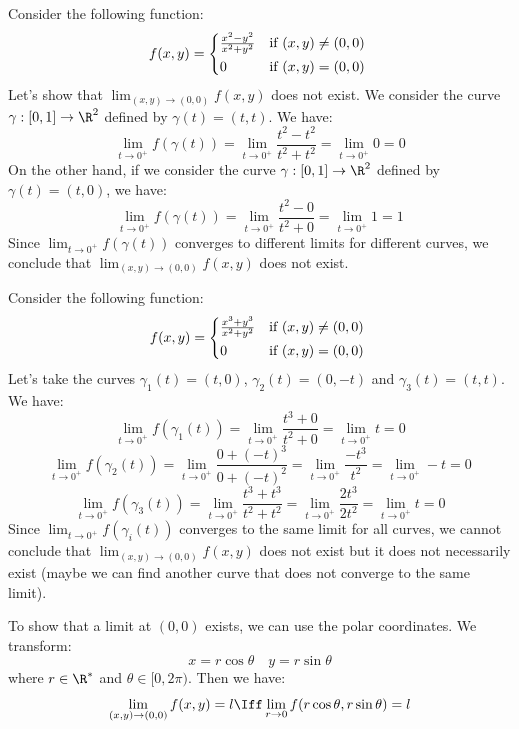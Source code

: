 \begin{eg}
    Consider the following function:
    \[
        f(x,y) = \begin{cases*}
            \frac{x^2 - y^2}{x^2 + y^2} & if $(x,y) \neq (0,0)$ \\
            0 & if $(x,y) = (0,0)$
        \end{cases*}
    \]
    Let's show that $\lim_{(x,y) \to (0,0)} f(x,y)$ does not exist. We consider the curve $\gamma: [0,1] \to \R^2$ defined by $\gamma(t) = (t,t)$. We have:
    \[
        \lim_{t \to 0^+} f(\gamma(t)) = \lim_{t \to 0^+} \frac{t^2 - t^2}{t^2 + t^2} = \lim_{t \to 0^+} 0 = 0
    \]
    On the other hand, if we consider the curve $\gamma: [0,1] \to \R^2$ defined by $\gamma(t) = (t,0)$, we have:
    \[
        \lim_{t \to 0^+} f(\gamma(t)) = \lim_{t \to 0^+} \frac{t^2 - 0}{t^2 + 0} = \lim_{t \to 0^+} 1 = 1
    \]
    Since $\lim_{t \to 0^+} f(\gamma(t))$ converges to different limits for different curves, we conclude that $\lim_{(x,y) \to (0,0)} f(x,y)$ does not exist.
\end{eg}

\begin{eg}
    Consider the following function:
    \[
        f(x,y) = \begin{cases*}
            \frac{x^3 + y^3}{x^2 + y^2} & if $(x,y) \neq (0,0)$ \\
            0 & if $(x,y) = (0,0)$
        \end{cases*}
    \]
    Let's take the curves $\gamma_1(t) = (t,0)$, $\gamma_2(t) = (0, -t)$ and $\gamma_3(t) = (t,t)$. We have:
    \[
        \lim_{t \to 0^+} f(\gamma_1(t)) = \lim_{t \to 0^+} \frac{t^3 + 0}{t^2 + 0} = \lim_{t \to 0^+} t = 0
    \]
    \[
        \lim_{t \to 0^+} f(\gamma_2(t)) = \lim_{t \to 0^+} \frac{0 + (-t)^3}{0 + (-t)^2} = \lim_{t \to 0^+} \frac{-t^3}{t^2} = \lim_{t \to 0^+} -t = 0
    \]
    \[
        \lim_{t \to 0^+} f(\gamma_3(t)) = \lim_{t \to 0^+} \frac{t^3 + t^3}{t^2 + t^2} = \lim_{t \to 0^+} \frac{2t^3}{2t^2} = \lim_{t \to 0^+} t = 0
    \]
    Since $\lim_{t \to 0^+} f(\gamma_i(t))$ converges to the same limit for all curves, we cannot conclude that $\lim_{(x,y) \to (0,0)} f(x,y)$ does not exist but it does not necessarily exist (maybe we can find another curve that does not converge to the same limit).
\end{eg}
To show that a limit at $(0,0)$ exists, we can use the polar coordinates. We transform:
\[
    x = r \cos \theta \quad y = r \sin \theta
\]
where $r \in \R^*$ and $\theta \in [0,2\pi)$. Then we have:
\[
    \lim_{(x,y) \to (0,0)} f(x,y) = l \Iff \lim_{r \to 0} f(r \cos \theta, r \sin \theta) = l
\]

